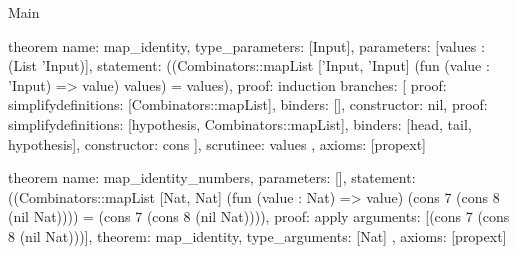 \begin{lexlean}{Main}
\begin{semanticmodule}
theorem{
  name: map_identity,
  type_parameters: [Input],
  parameters: [values : (List 'Input)],
  statement: ((Combinators::mapList ['Input, 'Input] (fun (value : 'Input) => value) values) = values),
  proof: induction{
    branches: [
      {proof: simplify{definitions: [Combinators::mapList]}, binders: [], constructor: nil},
      {
        proof: simplify{definitions: [hypothesis, Combinators::mapList]},
        binders: [head, tail, hypothesis],
        constructor: cons
      }
    ],
    scrutinee: values
  },
  axioms: [propext]
}

theorem{
  name: map_identity_numbers,
  parameters: [],
  statement: ((Combinators::mapList [Nat, Nat] (fun (value : Nat) => value) (cons 7 (cons 8 (nil Nat)))) = (cons 7 (cons 8 (nil Nat)))),
  proof: apply{
    arguments: [(cons 7 (cons 8 (nil Nat)))],
    theorem: map_identity,
    type_arguments: [Nat]
  },
  axioms: [propext]
}
\end{semanticmodule}
\end{lexlean}
